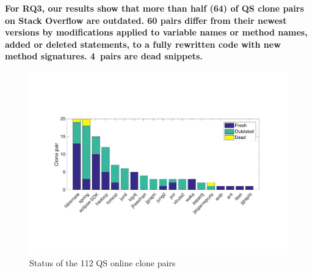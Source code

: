 \documentclass[sigconf,review, anonymous]{acmart}
\begin{document}
\textbf{For RQ3, our results show that more than half (64) of QS clone
  pairs on Stack Overflow are outdated. 60 pairs differ from their
  newest versions by modifications applied to variable names or method
  names, added or deleted statements, to a fully rewritten code with
  new method signatures. 4~pairs are dead
  snippets.} 


\begin{figure}
	\centering
	\includegraphics[width=\linewidth]{freshness}
	\caption{Status of the 112 QS online clone pairs}
	\label{fig:outdated}
\end{figure}
\end{document}
